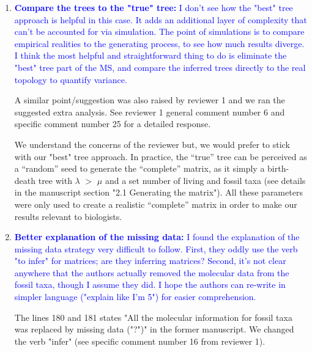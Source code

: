 \documentclass[12pt,letterpaper]{article}
\begin{document}
\begin{enumerate}
\item{\textcolor{blue}{\textbf{Compare the trees to the "true" tree:} I don't see how the "best" tree approach is helpful in this case. It adds an additional layer of complexity that can't be accounted for via simulation. The point of simulations is to compare empirical realities to the generating process, to see how much results diverge. I think the most helpful and straightforward thing to do is eliminate the "best" tree part of the MS, and compare the inferred trees directly to the real topology to quantify variance.}}

A similar point/suggestion was also raised by reviewer 1 and we ran the suggested extra analysis. See reviewer 1 general comment number 6 and specific comment number 25 for a detailed response.

We understand the concerns of the reviewer but, we would prefer to stick with our "best" tree approach.
In practice, the ``true'' tree can be perceived as a ``random'' seed to generate the ``complete'' matrix, as it simply a birth-death tree with $\lambda$ $>$ $\mu$ and a set number of living and fossil taxa (see details in the manuscript section "2.1 Generating the matrix").
All these parameters were only used to create a realistic ``complete'' matrix in order to make our results relevant to biologists. 



\item{\textcolor{blue}{\textbf{Better explanation of the missing data:} I found the explanation of the missing data strategy very difficult to follow. First, they oddly use the verb "to infer" for matrices; are they inferring matrices? Second, it's not clear anywhere that the authors actually removed the molecular data from the fossil taxa, though I assume they did. I hope the authors can re-write in simpler language ("explain like I'm 5") for easier comprehension.}}

The lines 180 and 181 states "All the molecular information for fossil taxa was replaced by missing data ("?")" in the former manuscript. We changed the verb "infer" (see specific comment number 16 from reviewer 1).


\end{enumerate}
\end{document}
